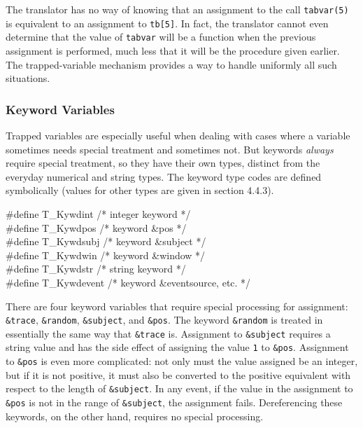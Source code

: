 The translator has no way of knowing that an assignment to the call
\texttt{tabvar(5)} is equivalent to an assignment to \texttt{tb[5]}. In
fact, the translator cannot even determine that the value of
\texttt{tabvar} will be a function when the previous assignment is
performed, much less that it will be the procedure given earlier.
The trapped-variable mechanism provides a way to handle
uniformly all such situations.

\subsubsection{Keyword Variables}
Trapped variables are especially useful when dealing with cases where a
variable sometimes needs special treatment and sometimes not. But keywords
{\em always} require special treatment, so they have their own types,
distinct from the everyday numerical and string types. The keyword type
codes are defined symbolically (values for other types are given in
section 4.4.3).

\begin{iconcode}
\#define \>\>\>T\_Kywdint	\>\>\>\>\>\> \>\>\>\>/* integer keyword */\\
\#define \>\>\>T\_Kywdpos	\>\>\>\>\>\> \>\>\>\>/* keyword \&pos */\\
\#define \>\>\>T\_Kywdsubj  \>\>\>\>\>\> \>\>\>\>/* keyword \&subject */\\
\#define \>\>\>T\_Kywdwin	\>\>\>\>\>\> \>\>\>\>/* keyword \&window */\\
\#define \>\>\>T\_Kywdstr	\>\>\>\>\>\> \>\>\>\>/* string keyword */\\
\#define \>\>\>T\_Kywdevent \>\>\>\>\>\> \>\>\>\>/* keyword \&eventsource, etc. */
\end{iconcode}

There are four keyword variables that require special processing for
assignment: \texttt{\&trace}, \texttt{\&random}, \texttt{\&subject},
and \texttt{\&pos}. The keyword \texttt{\&random} is treated in
essentially the same way that \texttt{\&trace} is. Assignment to
\texttt{\&subject} requires a string value and has the side effect of
assigning the value \texttt{1} to \texttt{\&pos}. Assignment to
\texttt{\&pos} is even more complicated: not only must the value
assigned be an integer, but if it is not positive, it must also be
converted to the positive equivalent with respect to the length of
\texttt{\&subject}. In any event, if the value in the assignment to
\texttt{\&pos} is not in the range of \texttt{\&subject}, the
assignment fails. Dereferencing these keywords, on the other hand,
requires no special processing.

